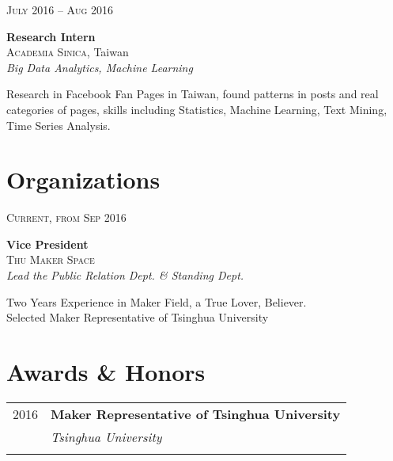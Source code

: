 \documentclass[10pt]{article} %
\begin{document}
{\begin{minipage}[t]{0.5\textwidth}
{\raggedleft\textsc{July 2016 -- Aug 2016}\par} 

{\raggedright\large \textbf{Research Intern} \\ \textsc{Academia Sinica}, Taiwan\\
\textit{Big Data Analytics, Machine Learning}\\[5pt]}

\normalsize{Research in Facebook Fan Pages in Taiwan, found patterns in posts and real categories of pages, skills including Statistics, Machine Learning, Text Mining, Time Series Analysis.}\\


\section{Organizations}

{\raggedleft\textsc{Current, from Sep 2016}\par}

{\raggedright\large \textbf{Vice President} \\ \textsc{Thu Maker Space}
\\
\textit{Lead the Public Relation Dept. \& Standing Dept.}\\[5pt]}

\normalsize{Two Years Experience in Maker Field, a True Lover, Believer.\\Selected Maker Representative of Tsinghua University}\\



\section{Awards \& Honors} 

\begin{tabular}{rl}
2016	 & \textbf{Maker Representative of Tsinghua University}\\
& \textit{Tsinghua University}\\ \\


\end{tabular}
\end{minipage}}
\end{document}
